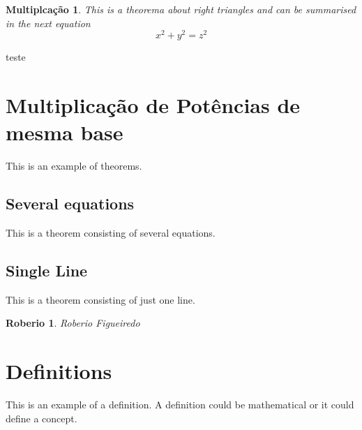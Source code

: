 \documentclass[11pt,fleqn]{book} %
\newtheorem{sinais}{Multiplcação}
\newtheorem{roberio}{Roberio}
\begin{document}
\begin{sinais} 
\label{pythagorean}
This is a theorema about right triangles and can be summarised in the next 
equation 
\[ x^2 + y^2 = z^2 \]
\end{sinais}

\begin{frame}
teste
\end{frame}





\section{Multiplicação de Potências de mesma base}
   
   






This is an example of theorems.

\subsection{Several equations}
This is a theorem consisting of several equations.



\subsection{Single Line}
This is a theorem consisting of just one line.

\begin{roberio}
Roberio Figueiredo
\end{roberio}


\section{Definitions}

This is an example of a definition. A definition could be mathematical or it could define a concept.
\end{document}
